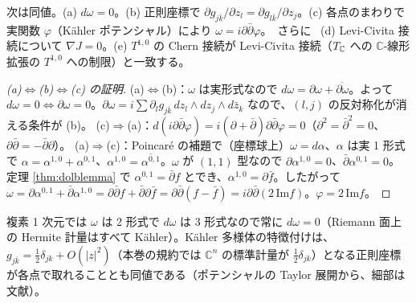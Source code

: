 \begin{thm}\label{thm:kahler}
次は同値。(a) $d\omega=0$。(b) 正則座標で $\partial g_{j\bar k}/\partial z_l=\partial g_{l\bar k}/\partial z_j$。(c) 各点のまわりで実関数 $\varphi$（Kähler ポテンシャル）により $\omega=i\partial\bar\partial\varphi$。\tP\ さらに \tC\ (d) Levi-Civita 接続について $\nabla J=0$。(e) $T^{1,0}$ の Chern 接続が Levi-Civita 接続（$T_{\mathbb C}$ への $\mathbb C$-線形拡張の $T^{1,0}$ への制限）と一致する。
\end{thm}
\begin{proof}[(a)$\Leftrightarrow$(b)$\Leftrightarrow$(c) の証明]
(a)$\Leftrightarrow$(b)：$\omega$ は実形式なので $d\omega=\partial\omega+\overline{\partial\omega}$。よって $d\omega=0\iff\partial\omega=0$。$\partial\omega=i\sum\partial_lg_{j\bar k}\,dz_l\wedge dz_j\wedge d\bar z_k$ なので、$(l,j)$ の反対称化が消える条件が (b)。
(c)$\Rightarrow$(a)：$d(i\partial\bar\partial\varphi)=i(\partial+\bar\partial)\partial\bar\partial\varphi=0$（$\partial^2=\bar\partial^2=0$、$\partial\bar\partial=-\bar\partial\partial$）。
(a)$\Rightarrow$(c)：Poincaré の補題で（座標球上）$\omega=d\alpha$、$\alpha$ は実 1 形式で $\alpha=\alpha^{1,0}+\alpha^{0,1}$、$\alpha^{1,0}=\overline{\alpha^{0,1}}$。$\omega$ が $(1,1)$ 型なので $\partial\alpha^{1,0}=0$、$\bar\partial\alpha^{0,1}=0$。定理 \ref{thm:dolblemma} で $\alpha^{0,1}=\bar\partial f$ とでき、$\alpha^{1,0}=\partial\bar f$。したがって $\omega=\partial\alpha^{0,1}+\bar\partial\alpha^{1,0}=\partial\bar\partial f+\bar\partial\partial\bar f=\partial\bar\partial(f-\bar f)=i\partial\bar\partial(2\,\mathrm{Im}f)$。$\varphi=2\,\mathrm{Im}f$。\qedhere
\end{proof}
\begin{rem}
複素 1 次元では $\omega$ は 2 形式で $d\omega$ は 3 形式なので常に $d\omega=0$（Riemann 面上の Hermite 計量はすべて Kähler）。Kähler 多様体の特徴付けは、$g_{j\bar k}=\tfrac12\delta_{jk}+O(|z|^2)$（本巻の規約では $\mathbb C^n$ の標準計量が $\tfrac12\delta_{jk}$）となる正則座標が各点で取れることとも同値である（ポテンシャルの Taylor 展開から、細部は文献）\tQ。
\end{rem}

